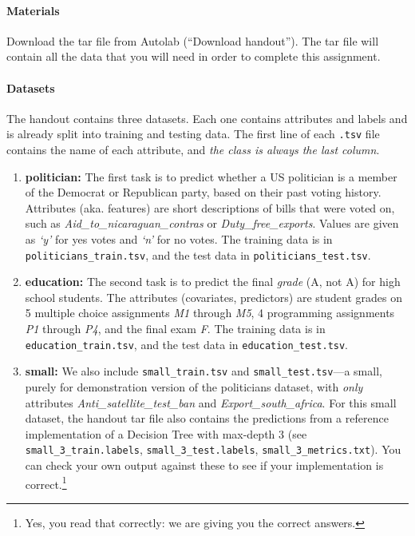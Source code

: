 \documentclass[11pt]{article}
\numberwithin{equation}{section} %
\numberwithin{figure}{section} %
\numberwithin{table}{section} %
\begin{document}
\paragraph{Materials} Download the tar file from Autolab (``Download
  handout''). The tar file will contain all the data that you will need
  in order to complete this assignment.

\paragraph{Datasets}

The handout contains three datasets. Each one contains attributes and labels and is already split into training and testing data. The first line of each \lstinline{.tsv} file contains the name of each attribute, and \emph{the class is always the last column}.

\begin{enumerate}
\item \textbf{politician:}
    The first task is to predict whether a US politician is a member of the Democrat or Republican party, based on their past voting history. Attributes (aka. features) are short descriptions of bills that were voted on, such as \emph{Aid\_to\_nicaraguan\_contras} or \emph{Duty\_free\_exports}. Values are given as \emph{`y'} for yes votes and \emph{`n'} for no votes. The training data is in \lstinline{politicians_train.tsv}, and the test data in \lstinline{politicians_test.tsv}.
\item \textbf{education:}
    The second task is to predict the final \emph{grade} (A, not A) for high school students. The attributes (covariates, predictors) are student grades on 5 multiple choice assignments \emph{M1} through \emph{M5}, 4 programming assignments \emph{P1} through \emph{P4}, and the final exam \emph{F}. The training data is in \newline \lstinline{education_train.tsv}, and the test data in \lstinline{education_test.tsv}.
\item \textbf{small:}
    We also include \lstinline{small_train.tsv} and \lstinline{small_test.tsv}---a small, purely for demonstration version of the politicians dataset, with \emph{only} attributes \emph{Anti\_satellite\_test\_ban} and \newline \emph{Export\_south\_africa}.  
    For this small dataset, the handout tar file also contains the predictions from a reference implementation of a Decision Tree with max-depth 3 (see \lstinline{small_3_train.labels}, \lstinline{small_3_test.labels}, \lstinline{small_3_metrics.txt}).
    You can check your own output against these to see if your implementation is correct.\footnote{Yes, you read that correctly: we are giving you the correct answers.}
\end{enumerate}
\end{document}
